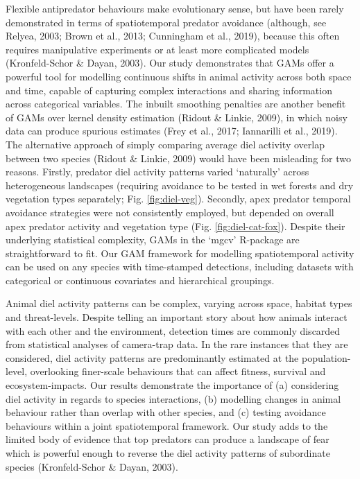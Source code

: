 \documentclass[]{elsarticle} %
\begin{document}
Flexible antipredator behaviours make evolutionary sense, but have been rarely demonstrated in terms of spatiotemporal predator avoidance (although, see Relyea, 2003; Brown et al., 2013; Cunningham et al., 2019), because this often requires manipulative experiments or at least more complicated models (Kronfeld-Schor \& Dayan, 2003). Our study demonstrates that GAMs offer a powerful tool for modelling continuous shifts in animal activity across both space and time, capable of capturing complex interactions and sharing information across categorical variables. The inbuilt smoothing penalties are another benefit of GAMs over kernel density estimation (Ridout \& Linkie, 2009), in which noisy data can produce spurious estimates (Frey et al., 2017; Iannarilli et al., 2019). The alternative approach of simply comparing average diel activity overlap between two species (Ridout \& Linkie, 2009) would have been misleading for two reasons. Firstly, predator diel activity patterns varied `naturally' across heterogeneous landscapes (requiring avoidance to be tested in wet forests and dry vegetation types separately; Fig. \ref{fig:diel-veg}). Secondly, apex predator temporal avoidance strategies were not consistently employed, but depended on overall apex predator activity and vegetation type (Fig. \ref{fig:diel-cat-fox}). Despite their underlying statistical complexity, GAMs in the `mgcv' R-package are straightforward to fit. Our GAM framework for modelling spatiotemporal activity can be used on any species with time-stamped detections, including datasets with categorical or continuous covariates and hierarchical groupings.

Animal diel activity patterns can be complex, varying across space, habitat types and threat-levels. Despite telling an important story about how animals interact with each other and the environment, detection times are commonly discarded from statistical analyses of camera-trap data. In the rare instances that they are considered, diel activity patterns are predominantly estimated at the population-level, overlooking finer-scale behaviours that can affect fitness, survival and ecosystem-impacts. Our results demonstrate the importance of (a) considering diel activity in regards to species interactions, (b) modelling changes in animal behaviour rather than overlap with other species, and (c) testing avoidance behaviours within a joint spatiotemporal framework. Our study adds to the limited body of evidence that top predators can produce a landscape of fear which is powerful enough to reverse the diel activity patterns of subordinate species (Kronfeld-Schor \& Dayan, 2003).
\end{document}
